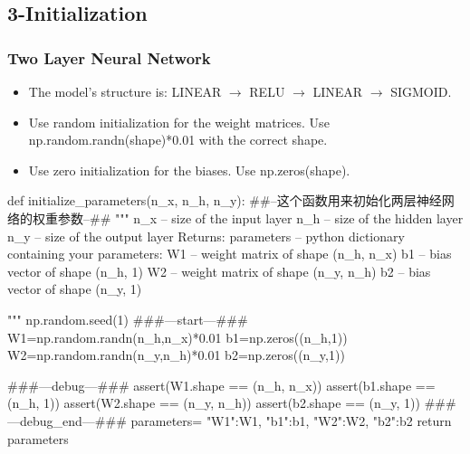 \documentclass[12pt,a4paper]{article}
\begin{document}
	\subsection{3-Initialization}
		\subsubsection{Two Layer Neural Network}
			\begin{itemize}
				\item The model’s structure is: LINEAR $\rightarrow$ RELU $\rightarrow$ LINEAR $\rightarrow$ SIGMOID. 
				
				\item Use random initialization for the weight matrices. Use np.random.randn(shape)*0.01 with the correct shape.
				\item Use zero initialization for the biases. Use np.zeros(shape).
				
			\end{itemize}
			\begin{python}
				def initialize_parameters(n_x, n_h, n_y):
				##--这个函数用来初始化两层神经网络的权重参数--##
				"""
				n_x -- size of the input layer
				n_h -- size of the hidden layer
				n_y -- size of the output layer
				Returns:
				parameters -- python dictionary containing your parameters:
				W1 -- weight matrix of shape (n_h, n_x)
				b1 -- bias vector of shape (n_h, 1)
				W2 -- weight matrix of shape (n_y, n_h)
				b2 -- bias vector of shape (n_y, 1)
				
				"""
				np.random.seed(1)
				###---start---###
				W1=np.random.randn(n_h,n_x)*0.01
				b1=np.zeros((n_h,1))
				W2=np.random.randn(n_y,n_h)*0.01
				b2=np.zeros((n_y,1))
				
				###---debug---###
				assert(W1.shape == (n_h, n_x))
				assert(b1.shape == (n_h, 1))
				assert(W2.shape == (n_y, n_h))
				assert(b2.shape == (n_y, 1))
				###---debug_end---###
				parameters={
					"W1":W1,
					"b1":b1,
					"W2":W2,
					"b2":b2
				}
				return parameters
			\end{python}
		\newpage
\end{document}
